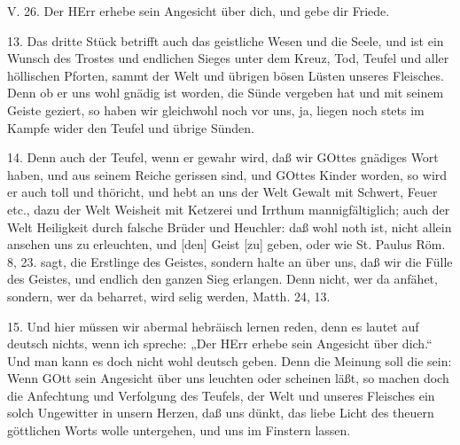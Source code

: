 \begin{schriftzitat}
V. 26. Der HErr erhebe sein Angesicht über dich, und gebe dir Friede.
\end{schriftzitat}

13. Das dritte Stück betrifft auch das geistliche Wesen und die Seele, und ist ein Wunsch des Trostes und endlichen Sieges unter dem Kreuz, Tod, Teufel und aller höllischen Pforten, sammt der Welt und übrigen bösen Lüsten unseres Fleisches. Denn ob er uns wohl gnädig ist worden, die Sünde vergeben hat und mit seinem Geiste geziert, so haben wir gleichwohl noch vor uns, ja, liegen noch stets im Kampfe wider den Teufel und übrige Sünden.

14. Denn auch der Teufel, wenn er gewahr wird, daß wir GOttes gnädiges Wort haben, und aus seinem Reiche gerissen sind, und GOttes Kinder worden, so wird er auch toll und thöricht, und hebt an uns der Welt Gewalt mit Schwert, Feuer etc., dazu der Welt Weisheit mit Ketzerei und Irrthum mannigfältiglich; auch der Welt Heiligkeit durch falsche Brüder und Heuchler: daß wohl noth ist, nicht allein ansehen uns zu erleuchten, und [den] Geist [zu] geben, oder wie St. Paulus Röm. 8, 23. sagt, die Erstlinge des Geistes, sondern halte an über uns, daß wir die Fülle des Geistes, und endlich den ganzen Sieg erlangen. Denn nicht, wer da anfähet, sondern, wer da beharret, wird selig werden, Matth. 24, 13.

15. Und hier müssen wir abermal hebräisch lernen reden, denn es lautet auf deutsch nichts, wenn ich spreche: „Der HErr erhebe sein Angesicht über dich.“ Und man kann es doch nicht wohl deutsch geben. Denn die Meinung soll die sein: Wenn GOtt sein Angesicht über uns leuchten oder scheinen läßt, so machen doch die Anfechtung und Verfolgung des Teufels, der Welt und unseres Fleisches ein solch Ungewitter in unsern Herzen, daß uns dünkt, das liebe Licht des theuern göttlichen Worts wolle untergehen, und uns im Finstern lassen.

